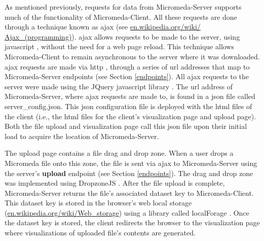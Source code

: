 As mentioned previously, requests for data from Micromeda-Server supports much 
of the functionality of Micromeda-Client. All these requests are done through a 
technique known as \gls{ajax} \cite{garrett2005ajax,li2012jquery} (see 
\href{http://en.wikipedia.org/wiki/Ajax_(programming)}{en.wikipedia.org/wiki/ 
Ajax\_(programming)}). \gls{ajax} allows requests to be made to the server, 
using \gls{javascript} \cite{flanagan2006javascript}, without the need for a web 
page reload. This technique allows Micromeda-Client to remain asynchronous to 
the server where it was downloaded. \gls{ajax} requests are made via \gls{http} 
\cite{fielding1999hypertext}, through a series of \gls{url} addresses 
\cite{berners1994rfc} that map to Micromeda-Server endpoints (see Section 
\ref{endpoints}). All \gls{ajax} requests to the server were made using the 
JQuery \gls{javascript} library \cite{chaffer2013learning,li2012jquery}. The 
\gls{url} address of Micromeda-Server, where \gls{ajax} requests are made to, is 
found in a \gls{json} file called server\_config.json. This \gls{json} 
configuration file is deployed with the \gls{html} files of the client (i.e., 
the \gls{html} files for the client's visualization page and upload page). Both 
the file upload and visualization page call this \gls{json} file upon their 
initial load to acquire the location of Micromeda-Server.

The upload page contains a file drag and drop zone. When a user drops a 
Micromeda file onto this zone, the file is sent via \gls{ajax} to Micromeda-Server 
using the server's \textbf{upload} endpoint (see Section \ref{endpoints}). 
The drag and drop zone was implemented using DropzoneJS \cite{meno}. After the 
file upload is complete, Micromeda-Server returns the file's associated dataset 
key to Micromeda-Client. This dataset key is stored in the browser's web local 
storage \cite{Hickson} 
(\href{http://en.wikipedia.org/wiki/Web_storage}{en.wikipedia.org/wiki/Web\_storage}) 
using a library called localForage \cite{localforage}. Once the dataset key is 
stored, the client redirects the browser to the visualization page where 
visualizations of uploaded file's contents are generated.

